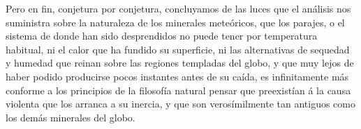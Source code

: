 \documentclass[a4paper, 11pt, oneside, polutonikogreek, spanish]{article}
\begin{document}
Pero en fin, conjetura por conjetura, concluyamos de las luces que el análisis nos suministra sobre la naturaleza de los minerales meteóricos, que los parajes, o el sistema de donde han sido desprendidos no puede tener por temperatura habitual, ni el calor que ha fundido su superficie, ni las alternativas de sequedad y humedad que reinan sobre las regiones templadas del globo, y que muy lejos de haber podido producirse pocos instantes antes de su caída, es infinitamente más conforme a los principios de la filosofía natural pensar que preexistían á la causa violenta que los arranca a su inercia, y que son verosímilmente tan antiguos como los demás minerales del globo.
\clearpage
\end{document}
